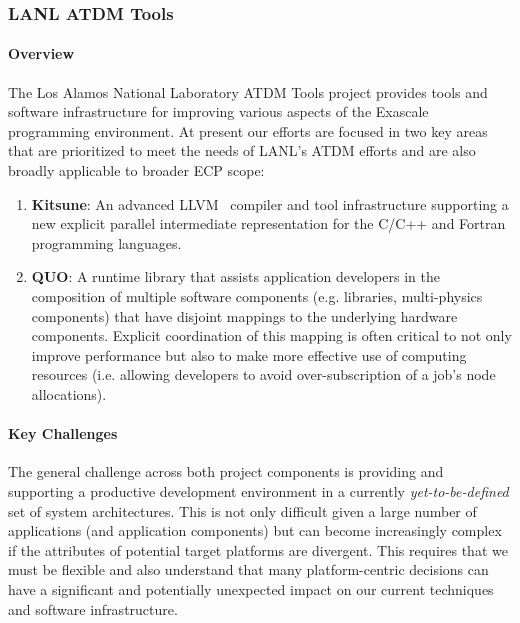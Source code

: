 \subsubsection{ LANL ATDM Tools}

\paragraph{Overview}
The Los Alamos National Laboratory ATDM Tools project provides tools and software 
infrastructure for improving various aspects of the Exascale programming 
environment.  At present our efforts are focused in two key areas that are prioritized 
to meet the needs of LANL's ATDM efforts and are also broadly applicable to broader 
ECP scope: 

\begin{enumerate}

 \item \textbf{Kitsune}: An advanced LLVM~\cite{LLVM:2018} compiler 
        and tool infrastructure supporting a new explicit parallel intermediate 
        representation for the C/C++ and Fortran programming languages. 
        
 \item \textbf{QUO}: A runtime library that assists application developers in the 
        composition of multiple software components (e.g. libraries, multi-physics 
        components) that have disjoint mappings to the underlying hardware components.
        Explicit coordination of this mapping is often critical to not only improve
        performance but also to make more effective use of computing resources (i.e. 
        allowing developers to avoid over-subscription of a job's node allocations).
        
\end{enumerate}

\paragraph{Key Challenges}
The general challenge across both project components is providing and supporting a 
productive development environment in a currently \emph{yet-to-be-defined} set of 
system architectures.  This is not only difficult given a large number of applications 
(and application components) but can become increasingly complex if the attributes of 
potential target platforms are divergent. This requires that we must be flexible and also
understand that many platform-centric decisions can have a significant and potentially 
unexpected impact on our current techniques and software infrastructure. 

